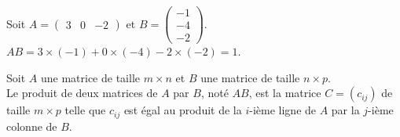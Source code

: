 \documentclass{cornouaille}
\begin{document}
\begin{exemple}
Soit $A=\begin{pmatrix}
3 & 0 & -2
\end{pmatrix}$ et $B=\begin{pmatrix}
-1\\ -4\\ -2 \end{pmatrix}$. $AB=3\times(-1)+0\times(-4)-2\times(-2)=1$.
\end{exemple}


\begin{definition}
Soit $A$ une matrice de taille $m\times n$ et $B$ une matrice de taille $n\times p$.\\
Le produit de deux matrices de $A$ par $B$, noté $AB$, est la matrice $C=(c_{ij})$ de taille $m\times p$ telle que $c_{ij}$ est égal au produit de la $i$-ième ligne de $A$ par la $j$-ième colonne de $B$.
\end{definition}
\end{document}
